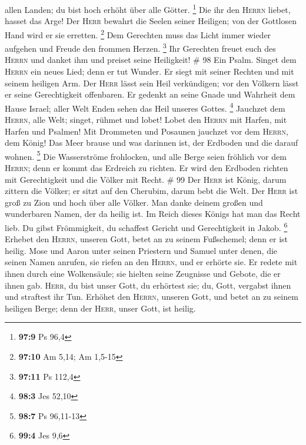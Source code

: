 allen Landen; du bist hoch erhöht über alle Götter. \footnote{\textbf{97:9}
  Ps 96,4}  Die ihr den \textsc{Herrn} liebet, hasset das
Arge! Der \textsc{Herr} bewahrt die Seelen seiner Heiligen; von der
Gottlosen Hand wird er sie erretten. \footnote{\textbf{97:10} Am 5,14;
  Am 1,5-15}  Dem Gerechten muss das Licht immer wieder
aufgehen und Freude den frommen Herzen. \footnote{\textbf{97:11} Ps
  112,4}  Ihr Gerechten freuet euch des \textsc{Herrn}
und danket ihm und preiset seine Heiligkeit! \# 98  Ein
Psalm. Singet dem \textsc{Herrn} ein neues Lied; denn er tut Wunder. Er
siegt mit seiner Rechten und mit seinem heiligen Arm.  Der
\textsc{Herr} lässt sein Heil verkündigen; vor den Völkern lässt er
seine Gerechtigkeit offenbaren.  Er gedenkt an seine Gnade
und Wahrheit dem Hause Israel; aller Welt Enden sehen das Heil unseres
Gottes. \footnote{\textbf{98:3} Jes 52,10}  Jauchzet dem
\textsc{Herrn}, alle Welt; singet, rühmet und lobet! 
Lobet den \textsc{Herrn} mit Harfen, mit Harfen und Psalmen!
 Mit Drommeten und Posaunen jauchzet vor dem
\textsc{Herrn}, dem König!  Das Meer brause und was
darinnen ist, der Erdboden und die darauf wohnen. \footnote{\textbf{98:7}
  Ps 96,11-13}  Die Wasserströme frohlocken, und alle
Berge seien fröhlich  vor dem \textsc{Herrn}; denn er
kommt das Erdreich zu richten. Er wird den Erdboden richten mit
Gerechtigkeit und die Völker mit Recht. \# 99  Der
\textsc{Herr} ist König, darum zittern die Völker; er sitzt auf den
Cherubim, darum bebt die Welt.  Der \textsc{Herr} ist groß
zu Zion und hoch über alle Völker.  Man danke deinem
großen und wunderbaren Namen, der da heilig ist.  Im Reich
dieses Königs hat man das Recht lieb. Du gibst Frömmigkeit, du schaffest
Gericht und Gerechtigkeit in Jakob. \footnote{\textbf{99:4} Jes 9,6}
 Erhebet den \textsc{Herrn}, unseren Gott, betet an zu
seinem Fußschemel; denn er ist heilig.  Mose und Aaron
unter seinen Priestern und Samuel unter denen, die seinen Namen anrufen,
sie riefen an den \textsc{Herrn}, und er erhörte sie.  Er
redete mit ihnen durch eine Wolkensäule; sie hielten seine Zeugnisse und
Gebote, die er ihnen gab.  \textsc{Herr}, du bist unser
Gott, du erhörtest sie; du, Gott, vergabst ihnen und straftest ihr Tun.
 Erhöhet den \textsc{Herrn}, unseren Gott, und betet an zu
seinem heiligen Berge; denn der \textsc{Herr}, unser Gott, ist heilig.
